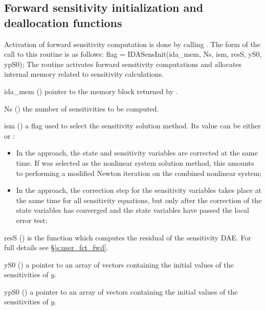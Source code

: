 \subsection{Forward sensitivity initialization and deallocation functions}
\label{ss:sensi_init}
Activation of forward sensitivity computation is done by calling
.
The form of the call to this routine is as follows:
{
  flag = IDASensInit(ida\_mem, Ns, ism, resS, yS0, ypS0);
}
{
  The routine  activates forward sensitivity computations and
  allocates internal memory related to sensitivity calculations.
}
{
  \begin{args}

  \item[ida\_mem] ()
    pointer to the {\idas} memory block returned by .
  \item[Ns] () 
    the number of sensitivities to be computed.
  \item[ism] ()
    a flag used to select the sensitivity solution method.  Its value can 
    be either  or :
    \begin{itemize}
    \item In the  approach, the state and sensitivity variables are
      corrected at the same time. If  was selected as the nonlinear system 
      solution method, this amounts to performing a modified Newton iteration on the
      combined nonlinear system;
    \item In the  approach, the correction step for the sensitivity
      variables takes place at the same time for all sensitivity equations, but only after 
      the correction of the state variables has converged and the state variables 
      have passed the local error test; 
    \end{itemize}
  \item[resS] ()
    is the {\CC} function which computes the residual of the sensitivity DAE. 
    For full details see \S\ref{s:user_fct_fwd}.
  \item[yS0] () 
    a pointer to an array of  vectors containing the initial 
    values of the sensitivities of $y$.
  \item[ypS0] () 
    a pointer to an array of  vectors containing the initial 
    values of the sensitivities of $\dot{y}$.
  \end{args}
}
